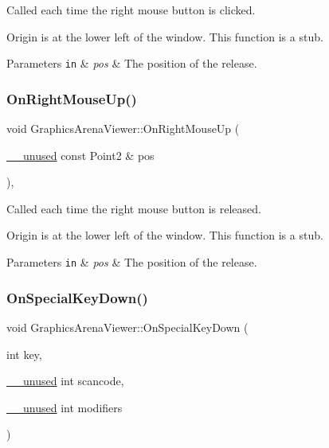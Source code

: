 Called each time the right mouse button is clicked. 

Origin is at the lower left of the window. This function is a stub.


\begin{DoxyParams}[1]{Parameters}
\mbox{\tt in}  & {\em pos} & The position of the release. \\
\hline
\end{DoxyParams}
\mbox{\label{class_graphics_arena_viewer_a5dfa16dca83575e253b6d3ea344f8746}} 
\subsubsection{\texorpdfstring{On\+Right\+Mouse\+Up()}{OnRightMouseUp()}}
{\footnotesize\ttfamily void Graphics\+Arena\+Viewer\+::\+On\+Right\+Mouse\+Up (\begin{DoxyParamCaption}\item[{\mbox{\hyperlink{common_8h_a2e3484535ee610c8e19e9859563abe48}{\+\_\+\+\_\+unused}} const Point2 \&}]{pos }\end{DoxyParamCaption})\hspace{0.3cm}{\ttfamily [inline]}, {\ttfamily [override]}}



Called each time the right mouse button is released. 

Origin is at the lower left of the window. This function is a stub.


\begin{DoxyParams}[1]{Parameters}
\mbox{\tt in}  & {\em pos} & The position of the release. \\
\hline
\end{DoxyParams}
\mbox{\label{class_graphics_arena_viewer_ab6ed6287ddf72f43f605482ce77b01a2}} 
\subsubsection{\texorpdfstring{On\+Special\+Key\+Down()}{OnSpecialKeyDown()}}
{\footnotesize\ttfamily void Graphics\+Arena\+Viewer\+::\+On\+Special\+Key\+Down (\begin{DoxyParamCaption}\item[{int}]{key,  }\item[{\mbox{\hyperlink{common_8h_a2e3484535ee610c8e19e9859563abe48}{\+\_\+\+\_\+unused}} int}]{scancode,  }\item[{\mbox{\hyperlink{common_8h_a2e3484535ee610c8e19e9859563abe48}{\+\_\+\+\_\+unused}} int}]{modifiers }\end{DoxyParamCaption})\hspace{0.3cm}{\ttfamily [override]}}



